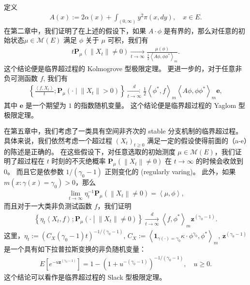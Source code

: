 \documentclass[12pt,a4paper]{amsart}
\numberwithin{equation}{section}
\theoremstyle{plain}
\theoremstyle{definition}
\begin{document}
定义
\begin{align}
  A(x) := 2\alpha(x) + \int_{(0,\infty)} y^2 \pi(x,dy),
\quad x\in E.
\end{align}
在第二章中，我们证明了在上述的假设下，如果 $A \cdot \phi$ 是有界的，那么对任意的初始状态$\mu\in \mathcal M(E)$ 满足 $\phi$ 关于 $\mu$ 可积，我们有
\begin{align}
  t \mathbf P_\mu \left( \|X_t\| \neq 0 \right) 
\xrightarrow[t\to \infty]{} 
  \frac{\mu(\phi)}{ \frac{1}{2} \left\langle A\phi, \phi\phi^* \right\rangle_m}.
\end{align}
这个结论便是临界超过程的 Kolmogrove 型极限定理。
更进一步的，对于任意非负可测函数 $f$, 我们有
\begin{align}
\left\{ \frac{\left\langle f,X_t \right\rangle}{t} ; \mathbf P_\mu \left( \cdot \middle| \|X_t\| > 0 \right) \right\}
  \xrightarrow[t\to \infty]{d} \frac{1}{2} \left\langle \phi^*, f \right\rangle_m \left\langle A\phi, \phi\phi^* \right\rangle_m \mathbf e,
\end{align}
其中 $\mathbf e$ 是一个期望为 $1$ 的指数随机变量。
这个结论便是临界超过程的 Yaglom 型极限定理。

在第五章中，我们考虑了一类具有空间非齐次的 stable 分支机制的临界超过程。具体来说，我们依然考虑一个超过程 $(X_t)_{t\geq 0}$ 满足一定的假设使得前面的（a-e）的陈述是正确的。
在这些假设下，对任意选取的初始测度 $\mu\in \mathcal M(E)$，我们证明了超过程在 $t$ 时刻的不灭绝概率 $\mathbf P_\mu\left( \left\| X_t \right\| \neq 0 \right)$ 在 $t\to \infty$ 的时候会收敛到 $0$。
而且它是依参数 $1/(\gamma_0 - 1)$ 正则变化的 (regularly varing)。
此外，如果 $m(x:\gamma(x) = \gamma_0)>0$，那么
\begin{align}
\lim_{t\to\infty} \eta_t^{-1}\mathbf P_\mu\left( \left\| X_t \right\| \neq 0 \right) 
= \left\langle \mu,\phi \right\rangle,
\end{align}
而且对于一大类非负测试函数 $f$，我们证明
\begin{align}
\left\{ \eta_t \left\langle X_t,f \right\rangle ; \mathbf P_\mu \left( \cdot \middle| \left\| X_t \right\| \neq 0\right) \right\}
\xrightarrow[t\to \infty]{d} \left\langle f,\phi^* \right\rangle_m \mathbf z^{(\gamma_0 - 1)}. 
\end{align}
这里，$\eta_t:= \left( C_X(\gamma_0 - 1) t \right)^{-1/(\gamma_0 - 1)}$, $C_X:=\left\langle \mathbf{1}_{\gamma(\cdot)=\gamma_0}\kappa\cdot \phi^{\gamma_0}, \phi^* \right\rangle_m$, $\mathbf{z}^{(\gamma_0 - 1)}$ 是一个具有如下拉普拉斯变换的非负随机变量： 
\begin{align}
E\left[ e^{-u \mathbf{z}^{(\gamma_0 - 1)}} \right]
= 1 - \left( 1+u^{-(\gamma_0 - 1)} \right)^{-1/(\gamma_0 - 1)},
\quad u \geq 0.
\end{align}
这个结论可以看作是临界超过程的 Slack 型极限定理。



\end{document}
